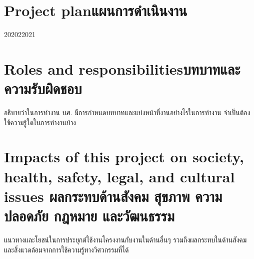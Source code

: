 \section{\ifenglish Project plan\else แผนการดำเนินงาน\fi}

\begin{plan}{6}{2020}{2}{2021}
\end{plan}

\section{\ifenglish Roles and responsibilities\else บทบาทและความรับผิดชอบ\fi}
อธิบายว่าในการทำงาน นศ. มีการกำหนดบทบาทและแบ่งหน้าที่งานอย่างไรในการทำงาน จำเป็นต้องใช้ความรู้ใดในการทำงานบ้าง

\section{\ifenglish%
Impacts of this project on society, health, safety, legal, and cultural issues
\else%
ผลกระทบด้านสังคม สุขภาพ ความปลอดภัย กฎหมาย และวัฒนธรรม
\fi}

แนวทางและโยชน์ในการประยุกต์ใช้งานโครงงานกับงานในด้านอื่นๆ รวมถึงผลกระทบในด้านสังคมและสิ่งแวดล้อมจากการใช้ความรู้ทางวิศวกรรมที่ได้

